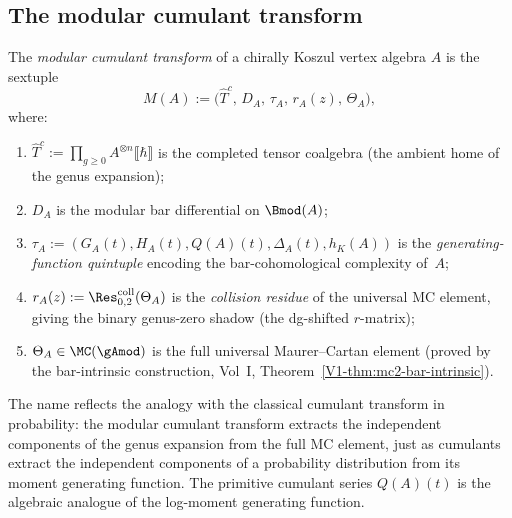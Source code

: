 \subsection{The modular cumulant transform}

\begin{definition}
The \emph{modular cumulant transform} of a chirally Koszul vertex
algebra $A$ is the sextuple
\begin{equation}%
M(A)
:=
\bigl(\widehat{T}^c,\, D_A,\, \tau_A,\, r_A(z),\, \Theta_A\bigr),
\end{equation}
where:
\begin{enumerate}[leftmargin=2.4em]
\item $\widehat{T}^c := \prod_{g \ge 0} A^{\otimes n} \llbracket\hbar\rrbracket$
is the completed tensor coalgebra (the ambient home of the genus expansion);

\item $D_A$ is the modular bar differential on $\Bmod(A)$;

\item $\tau_A := (G_A(t), H_A(t), Q(A)(t), \Delta_A(t), h_K(A))$
is the \emph{generating-function quintuple} encoding the bar-cohomological
complexity of~$A$;

\item $r_A(z) := \Res^{\mathrm{coll}}_{0,2}(\Theta_A)$ is the
\emph{collision residue} of the universal MC element, giving the binary
genus-zero shadow (the dg-shifted $r$-matrix);

\item $\Theta_A \in \MC(\gAmod)$ is the full universal Maurer--Cartan
element (proved by the bar-intrinsic construction,
Vol~I, Theorem~\ref*{V1-thm:mc2-bar-intrinsic}).
\end{enumerate}
\end{definition}

\begin{remark}
The name reflects the analogy with the classical cumulant transform in
probability: the modular cumulant transform extracts the independent
components of the genus expansion from the full MC element, just as
cumulants extract the independent components of a probability distribution
from its moment generating function. The primitive cumulant series
$Q(A)(t)$ is the algebraic analogue of the log-moment generating function.
\end{remark}

